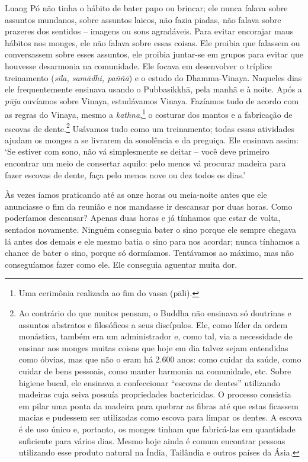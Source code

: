 Luang Pó não tinha o hábito de bater papo ou brincar; ele nunca falava
sobre assuntos mundanos, sobre assuntos laicos, não fazia piadas, não
falava sobre prazeres dos sentidos -- imagens ou sons agradáveis. Para
evitar encorajar maus hábitos nos monges, ele não falava sobre essas
coisas. Ele proibia que falassem ou conversassem sobre esses assuntos,
ele proibia juntar-se em grupos para evitar que houvesse desarmonia na
comunidade. Ele focava em desenvolver o tríplice treinamento
(\emph{sīla, samādhi, paññā}) e o estudo do Dhamma-Vinaya. Naqueles dias
ele frequentemente ensinava usando o Pubbasikkhā, pela manhã e à noite.
Após a \emph{pūja} ouvíamos sobre Vinaya, estudávamos Vinaya. Fazíamos
tudo de acordo com as regras do Vinaya, mesmo a \emph{kathna},\footnote{Uma
  cerimônia realizada ao fim do vassa (pāli).} o costurar dos
mantos e a fabricação de escovas de dente.\footnote{Ao contrário do que
  muitos pensam, o Buddha não ensinava só doutrinas e assuntos abstratos
  e filosóficos a seus discípulos. Ele, como líder da ordem monástica,
  também era um administrador e, como tal, via a necessidade de ensinar
  aos monges muitas coisas que hoje em dia talvez sejam entendidas como
  óbvias, mas que não o eram há 2.600 anos: como cuidar da saúde, como
  cuidar de bens pessoais, como manter harmonia na comunidade, etc.
  Sobre higiene bucal, ele ensinava a confeccionar ``escovas de dentes''
  utilizando madeiras cuja seiva possuía propriedades bactericidas. O
  processo consistia em pilar uma ponta da madeira para quebrar as
  fibras até que estas ficassem macias e pudessem ser utilizadas como
  escova para limpar os dentes. A escova é de uso único e, portanto, os
  monges tinham que fabricá-las em quantidade suficiente para vários
  dias. Mesmo hoje ainda é comum encontrar pessoas utilizando esse
  produto natural na Índia, Tailândia e outros países da Ásia.}
Usávamos tudo como um treinamento; todas essas atividades ajudam os
monges a se livrarem da sonolência e da preguiça. Ele ensinava assim:
`Se estiver com sono, não vá simplesmente se deitar -- você deve
primeiro encontrar um meio de consertar aquilo: pelo menos vá procurar
madeira para fazer escovas de dente, faça pelo menos nove ou dez todos
os dias.'

Às vezes íamos praticando até as onze horas ou meia-noite antes que ele
anunciasse o fim da reunião e nos mandasse ir descansar por duas horas.
Como poderíamos descansar? Apenas duas horas e já tínhamos que estar de
volta, sentados novamente. Ninguém conseguia bater o sino porque ele
sempre chegava lá antes dos demais e ele mesmo batia o sino para nos
acordar; nunca tínhamos a chance de bater o sino, porque só dormíamos.
Tentávamos ao máximo, mas não conseguíamos fazer como ele. Ele conseguia
aguentar muita dor.

